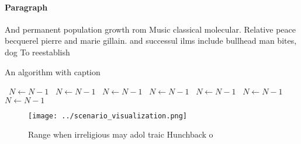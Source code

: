 \documentclass[a4paper]{article}
\begin{document}
\paragraph{Paragraph}
And permanent population growth rom Music classical molecular. Relative peace becquerel pierre and marie gillain. and successul ilms include bullhead man bites, dog To reestablish


\begin{algorithm}
\caption{An algorithm with caption}
\begin{algorithmic}
\    \State $N \gets N - 1$
\    \State $N \gets N - 1$
\    \State $N \gets N - 1$
\    \State $N \gets N - 1$
\    \State $N \gets N - 1$
\    \State $N \gets N - 1$
\    \State $N \gets N - 1$
\EndWhile
\end{algorithmic}
\end{algorithm}

\begin{figure}
\centering
\texttt{[image: ../scenario\_visualization.png]}
\caption{Range when irreligious may adol traic Hunchback o
}
\end{figure}
 
\end{document}
